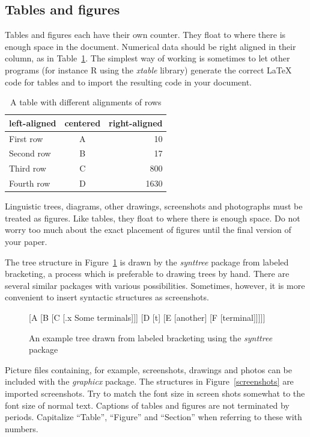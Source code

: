 \documentclass[11pt,twoside]{article}
\begin{document}
\subsection{Tables and figures}

Tables and figures each have their own counter.
They float to where there is enough space in the document.
Numerical data should be right aligned in their column, as in Table~\ref{table}.
The simplest way of working is sometimes to let other programs (for instance R using the \emph{xtable} library) generate the correct LaTeX code for tables and to import the resulting code in your document.

\begin{table}[htbp]
 \centering
  \begin{tabular}{lcr} \hline %
      left-aligned & centered & right-aligned\\ \hline
      First row & A & 10 \\
      Second row & B & 17\\
      Third row & C & 800\\ 
      Fourth row & D & 1630\\ \hline
  \end{tabular}
  \caption{A table with different alignments of rows} \label{table}
\end{table}

Linguistic trees, diagrams, other drawings, screenshots and photographs must be treated as figures.
Like tables, they float to where there is enough space.
Do not worry too much about the exact placement of figures until the final version of your paper.

The tree structure in Figure~\ref{synttree} is drawn by the \emph{synttree} package from labeled bracketing, a process which is preferable to drawing trees by hand.
There are several similar packages with various possibilities.
Sometimes, however, it is more convenient to insert syntactic structures as screenshots.

\begin{figure}[htbp] %
\centering
{}
[A [B [C [.x Some terminals]]] [D [t] [E [another] [F [terminal]]]]]
\caption{An example tree drawn from labeled bracketing using the \emph{synttree} package} \label{synttree}
\end{figure}

Picture files containing, for example, screenshots, drawings and photos can be included with the \emph{graphicx} package.
The structures in Figure~\ref{screenshots} are imported screenshots. 
Try to match the font size in screen shots somewhat to the font size of normal text.
Captions of tables and figures are not terminated by periods.
Capitalize “Table”, “Figure” and “Section” when referring to these with numbers.
\end{document}
